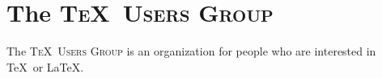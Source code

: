 \documentclass{article}
\newcommand{\TUG}{\textsc{\TeX\ Users Group}\xspace}
\begin{document}
\section{The \TUG}
The \TUG is an organization for people who are interested in \TeX\ or \LaTeX.
\end{document}

